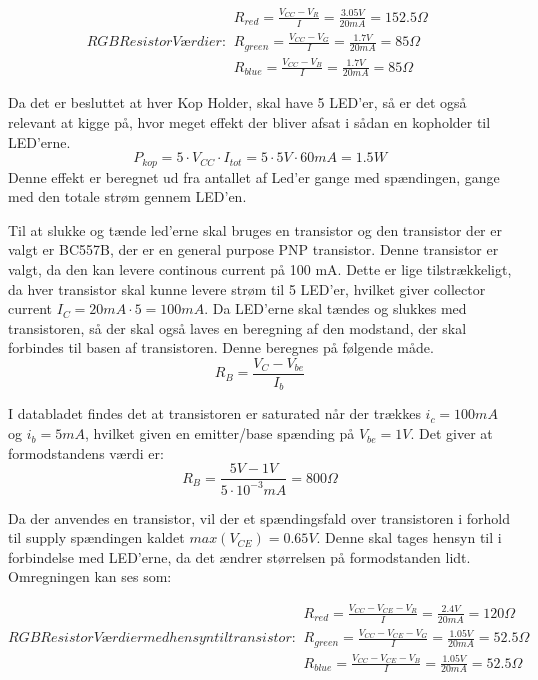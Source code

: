 \documentclass[HardwareDesign/HardwareDesign_main.tex]{subfiles}
\begin{document}
\begin{subequations}
        RGB Resistor Værdier:
\begin{align}
        R_{red}=\frac{V_{CC}-V_R}{I}=\frac{3.05V}{20mA}=152.5\Omega\\
        R_{green}=\frac{V_{CC}-V_G}{I}=\frac{1.7V}{20mA}=85\Omega\\
        R_{blue}=\frac{V_{CC}-V_B}{I}=\frac{1.7V}{20mA}=85\Omega
\end{align}
\end{subequations}

Da det er besluttet at hver Kop Holder, skal have 5 LED'er, så er det også relevant at kigge på, hvor meget effekt der bliver afsat i sådan en kopholder til LED'erne.
\begin{equation}
    P_{kop}=5\cdot V_{CC}\cdot I_{tot} = 5\cdot 5V\cdot 60mA = 1.5W
\end{equation}
Denne effekt er beregnet ud fra antallet af Led'er gange med spændingen, gange med den totale strøm gennem LED'en.

Til at slukke og tænde led'erne skal bruges en transistor og den transistor der er valgt er BC557B, der er en general purpose PNP transistor. Denne transistor er valgt, da den kan levere continous current på 100 mA. Dette er lige tilstrækkeligt, da hver transistor skal kunne levere strøm til 5 LED'er, hvilket giver collector current $I_C=20mA\cdot5=100mA$.
Da LED'erne skal tændes og slukkes med transistoren, så der skal også laves en beregning af den modstand, der skal forbindes til basen af transistoren.
Denne beregnes på følgende måde.
\begin{equation}
    R_B = \frac{V_C-V_{be}}{I_b}
\end{equation}

I databladet \cite{datasheet_bc557b} findes det at transistoren er saturated når der trækkes $i_c=100mA$ og $i_b=5mA$, hvilket given en emitter/base spænding på $V_{be}=1V$. Det giver at formodstandens værdi er:
\begin{equation}
    R_B = \frac{5V-1V}{5\cdot 10^{-3} mA}=800\Omega
\end{equation}

Da der anvendes en transistor, vil der et spændingsfald over transistoren i forhold til supply spændingen kaldet $max(V_{CE})=0.65V$. Denne skal tages hensyn til i forbindelse med LED'erne, da det ændrer størrelsen på formodstanden lidt. Omregningen kan ses som:

\begin{subequations}
        RGB Resistor Værdier med hensyn til transistor:
\begin{align}
        R_{red}=\frac{V_{CC}-V_{CE}-V_R}{I}=\frac{2.4V}{20mA}=120\Omega\\
        R_{green}=\frac{V_{CC}-V_{CE}-V_G}{I}=\frac{1.05V}{20mA}=52.5\Omega\\
        R_{blue}=\frac{V_{CC}-V_{CE}-V_B}{I}=\frac{1.05V}{20mA}=52.5\Omega
\end{align}
\end{subequations}
\end{document}
